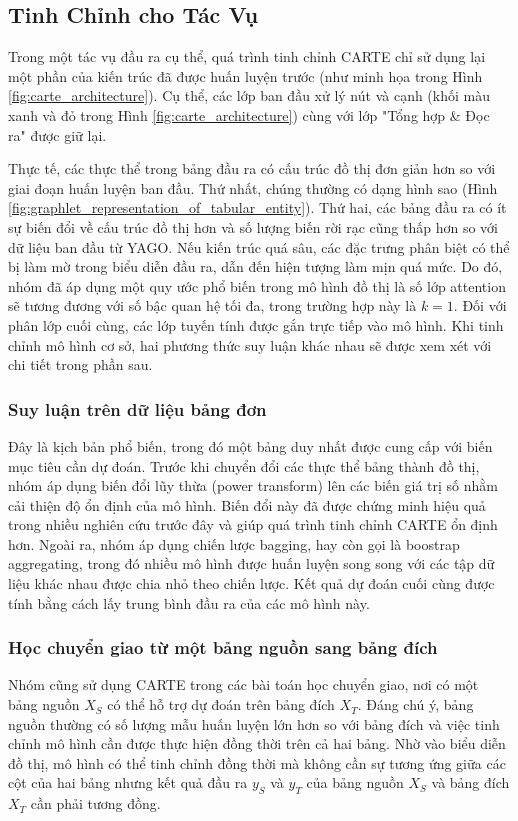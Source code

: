 \documentclass{article}
\begin{document}
\subsection{Tinh Chỉnh cho Tác Vụ}
Trong một tác vụ đầu ra cụ thể, quá trình tinh chỉnh CARTE chỉ sử dụng lại một phần của kiến trúc đã được huấn luyện trước (như minh họa trong Hình \ref{fig:carte_architecture}). Cụ thể, các lớp ban đầu xử lý nút và cạnh (khối màu xanh và đỏ trong Hình \ref{fig:carte_architecture}) cùng với lớp "Tổng hợp \& Đọc ra" được giữ lại.

Thực tế, các thực thể trong bảng đầu ra có cấu trúc đồ thị đơn giản hơn so với giai đoạn huấn luyện ban đầu. Thứ nhất, chúng thường có dạng hình sao (Hình \ref{fig:graphlet_representation_of_tabular_entity}). Thứ hai, các bảng đầu ra có ít sự biến đổi về cấu trúc đồ thị hơn và số lượng biến rời rạc cũng thấp hơn so với dữ liệu ban đầu từ YAGO. Nếu kiến trúc quá sâu, các đặc trưng phân biệt có thể bị làm mờ trong biểu diễn đầu ra, dẫn đến hiện tượng làm mịn quá mức. Do đó, nhóm đã áp dụng một quy ước phổ biến trong mô hình đồ thị là số lớp attention sẽ tương đương với số bậc quan hệ tối đa, trong trường hợp này là $k=1$. Đối với phân lớp cuối cùng, các lớp tuyến tính được gắn trực tiếp vào mô hình. Khi tinh chỉnh mô hình cơ sở, hai phương thức suy luận khác nhau sẽ được xem xét với chi tiết trong phần sau.

\subsubsection{Suy luận trên dữ liệu bảng đơn}
Đây là kịch bản phổ biến, trong đó một bảng duy nhất được cung cấp với biến mục tiêu cần dự đoán. Trước khi chuyển đổi các thực thể bảng thành đồ thị, nhóm áp dụng biến đổi lũy thừa (power transform) lên các biến giá trị số nhằm cải thiện độ ổn định của mô hình. Biến đổi này đã được chứng minh hiệu quả trong nhiều nghiên cứu trước đây và giúp quá trình tinh chỉnh CARTE ổn định hơn. Ngoài ra, nhóm áp dụng chiến lược bagging, hay còn gọi là boostrap aggregating, trong đó nhiều mô hình được huấn luyện song song với các tập dữ liệu khác nhau được chia nhỏ theo chiến lược. Kết quả dự đoán cuối cùng được tính bằng cách lấy trung bình đầu ra của các mô hình này.

\subsubsection{Học chuyển giao từ một bảng nguồn sang bảng đích}
Nhóm cũng sử dụng CARTE trong các bài toán học chuyển giao, nơi có một bảng nguồn $X_S$ có thể hỗ trợ dự đoán trên bảng đích $X_T$. Đáng chú ý, bảng nguồn thường có số lượng mẫu huấn luyện lớn hơn so với bảng đích và việc tinh chỉnh mô hình cần được thực hiện đồng thời trên cả hai bảng. Nhờ vào biểu diễn đồ thị, mô hình có thể tinh chỉnh đồng thời mà không cần sự tương ứng giữa các cột của hai bảng nhưng kết quả đầu ra $y_S$ và $y_T$ của bảng nguồn $X_S$ và bảng đích $X_T$ cần phải tương đồng.
\end{document}
